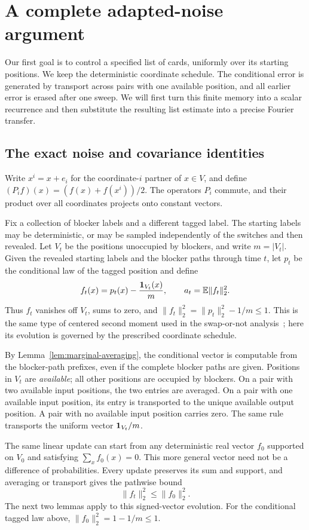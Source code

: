 \section{A complete adapted-noise argument}\label{sec:first-route}

Our first goal is to control a specified list of cards, uniformly over
its starting positions. We keep the deterministic coordinate schedule.
The conditional error is generated by transport across pairs with one
available position, and all earlier error is erased after one sweep.
We will first turn this finite memory into a scalar recurrence and then
substitute the resulting list estimate into a precise Fourier transfer.

\subsection{The exact noise and covariance identities}

Write $x^i=x+e_i$ for the coordinate-$i$ partner of $x\in V$, and
define $(P_i f)(x)=(f(x)+f(x^i))/2$. The operators $P_i$ commute,
and their product over all coordinates projects onto constant vectors.

Fix a collection of blocker labels and a different tagged label. The
starting labels may be deterministic, or may be sampled independently of
the switches and then revealed. Let $V_t$ be the positions unoccupied by
blockers, and write $m=|V_t|$. Given the revealed starting labels and the
blocker paths through time $t$, let $p_t$ be the conditional law of the
tagged position and define
\[
 f_t(x)=p_t(x)-\frac{\mathbf 1_{V_t}(x)}m,
 \qquad a_t=\mathbb E\|f_t\|_2^2.
\]
Thus $f_t$ vanishes off $V_t$, sums to zero, and
$\|f_t\|_2^2=\|p_t\|_2^2-1/m\le1$.
This is the same type of centered second moment used in the
swap-or-not analysis~\cite[Section~3]{hmr2014}; here its evolution is
governed by the prescribed coordinate schedule.

By Lemma~\ref{lem:marginal-averaging}, the conditional vector is
computable from the blocker-path prefixes, even if the complete blocker
paths are given. Positions in $V_t$ are \emph{available}; all other
positions are occupied by blockers. On a pair with two available input
positions, the two entries are averaged. On a pair with one available
input position, its entry is transported to the unique available output
position. A pair with no available input position carries zero. The same
rule transports the uniform vector $\mathbf 1_{V_t}/m$.

The same linear update can start from any deterministic real vector
$f_0$ supported on $V_0$ and satisfying $\sum_x f_0(x)=0$.
This more general vector need not be a difference of probabilities.
Every update preserves its sum and support, and averaging or transport
gives the pathwise bound
\begin{equation}\label{noise:pathwise-contraction}
 \|f_t\|_2^2\le\|f_0\|_2^2.
\end{equation}
The next two lemmas apply to this signed-vector evolution. For the
conditional tagged law above, $\|f_0\|_2^2=1-1/m\le1$.

